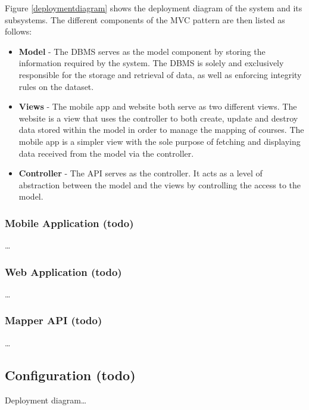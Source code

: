 \documentclass{article}
\begin{document}
    Figure \ref{deploymentdiagram} shows the deployment diagram of the system
    and its subsystems. The different components of the MVC pattern are then
    listed as follows:

    \begin{itemize}
        \item \textbf{Model} - The DBMS serves as the model component by
            storing the information required by the system. The DBMS is solely
            and exclusively responsible for the storage and retrieval of data,
            as well as enforcing integrity rules on the dataset.
        \item \textbf{Views} - The mobile app and website both serve as two
            different views. The website is a view that uses the controller to
            both create, update and destroy data stored within the model in
            order to manage the mapping of courses. The mobile app is a simpler
            view with the sole purpose of fetching and displaying data received
            from the model via the controller.
        \item \textbf{Controller} - The API serves as the controller. It acts
            as a level of abstraction between the model and the views by
            controlling the access to the model.
    \end{itemize}

    \subsubsection{Mobile Application (todo)}

    \ldots

    \subsubsection{Web Application (todo)}

    \ldots

    \subsubsection{Mapper API (todo)}

    \ldots

    \subsection{Configuration (todo)}

    Deployment diagram\ldots
\end{document}
